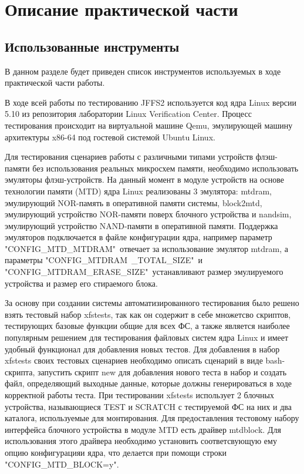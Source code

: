 \section{Описание практической части}
\label{sec:Chapter4} 

\subsection{Использованные инструменты}

В данном разделе будет приведен список инструментов используемых в ходе практической части работы.

В ходе всей работы по тестированию JFFS2 используется код ядра Linux версии 5.10 из репозитория \cite{lvcrepo} лаборатории Linux Verification Center. Процесс тестирования происходит на виртуальной машине Qemu, эмулирующей машину архитектуры x86-64 под гостевой системой Ubuntu Linux.

Для тестирования сценариев работы с различными типами устройств флэш-памяти без использования реальных микросхем памяти, необходимо использовать эмуляторы флэш-устройств. На данный момент в модуле устройств на основе технологии памяти (MTD) \cite{mtd} ядра Linux реализованы 3 эмулятора: mtdram, эмулирующий NOR-память в оперативной памяти системы, block2mtd, эмулирующий устройство NOR-памяти поверх блочного устройства и nandsim, эмулирующий устройство NAND-памяти в оперативной памяти. Поддержка эмуляторов подключается в файле конфигурации ядра, например параметр "CONFIG\_MTD\_MTDRAM"\ отвечает за использование эмулятор mtdram, а параметры "CONFIG\_MTDRAM\ \_TOTAL\_SIZE"\ и "CONFIG\_MTDRAM\_ERASE\_SIZE"\ устанавливают размер эмулируемого устройства и размер его стираемого блока.

За основу при создании системы автоматизированного тестирования было решено взять тестовый набор xfstests, так как он содержит в себе множетсво скриптов, тестирующих базовые функции общие для всех ФС, а также является наиболее популярным решением для тестирования файловых систем ядра Linux и имеет удобный функционал для добавления новых тестов. Для добавления в набор xfstests своих тестовых сценариев необходимо описать сценарий в виде bash-скрипта, запустить скрипт new для добавления нового теста в набор и создать файл, определяющий выходные данные, которые должны генерироваться в ходе корректной работы теста. При тестировании xfstests использует 2 блочных устройства, называющиеся TEST и SCRATCH с тестируемой ФС на них и два каталога, используемые для монтирования. Для предоставления тестовому набору интерфейса блочного устройства в модуле MTD есть драйвер mtdblock. Для использования этого драйвера необходимо установить соответсвующую ему опцию конфигурацияи ядра, что делается при помощи строки  "CONFIG\_MTD\_BLOCK=y".

